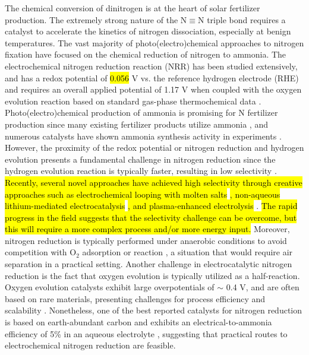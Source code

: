 The chemical conversion of dinitrogen is at the heart of solar fertilizer production. The extremely strong nature of the N$\equiv$N triple bond requires a catalyst to accelerate the kinetics of nitrogen dissociation, especially at benign temperatures. The vast majority of photo(electro)chemical approaches to nitrogen fixation have focused on the chemical reduction of nitrogen to ammonia. The electrochemical nitrogen reduction reaction (NRR) has been studied extensively, and has a redox potential of \hl{0.056} V vs. the reference hydrogen electrode (RHE) and requires an overall applied potential of 1.17 V when coupled with the oxygen evolution reaction based on standard gas-phase thermochemical data \cite{Medford_2017, Chen_2018}. Photo(electro)chemical production of ammonia is promising for N fertilizer production since many existing fertilizer products utilize ammonia  \cite{Waller_2016}, and numerous catalysts have shown ammonia synthesis activity in experiments \cite{McPherson_2019, Medford_2017}. However, the proximity of the redox potential or nitrogen reduction and hydrogen evolution presents a fundamental challenge in nitrogen reduction since the hydrogen evolution reaction is typically faster, resulting in low selectivity \cite{Skulason_2012,Singh_2017}. \hl{Recently, several novel approaches have achieved high selectivity through creative approaches such as electrochemical looping with molten salts} \cite{McEnaney_2017}\hl{, non-aqueous lithium-mediated electrocatalysis} \cite{Lazouski_2019}\hl{, and plasma-enhanced electrolysis} \cite{Hawtof_2019}. \hl{The rapid progress in the field suggests that the selectivity challenge can be overcome, but this will require a more complex process and/or more energy input.} Moreover, nitrogen reduction is typically performed under anaerobic conditions to avoid competition with O$_2$ adsorption or reaction \cite{Hirakawa_2017}, a situation that would require air separation in a practical setting. Another challenge in electrocatalytic nitrogen reduction is the fact that oxygen evolution is typically utilized as a half-reaction. Oxygen evolution catalysts exhibit large overpotentials of $\sim$ 0.4 V, and are often based on rare materials, presenting challenges for process efficiency and scalability \cite{Jiao_2015, Seh_2017}. Nonetheless, one of the best reported catalysts for nitrogen reduction is based on earth-abundant carbon and exhibits an electrical-to-ammonia efficiency of 5\% in an aqueous electrolyte \cite{Song_2018}, suggesting that practical routes to electrochemical nitrogen reduction are feasible.

